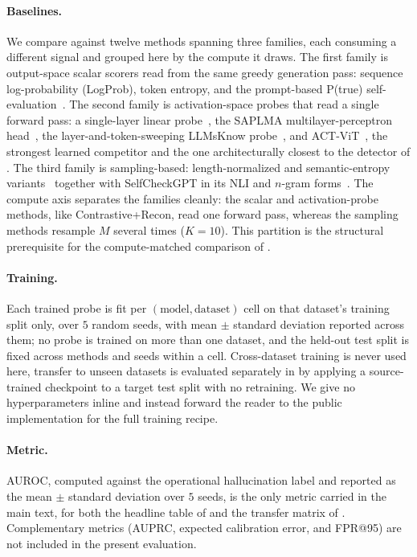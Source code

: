 \paragraph{Baselines.}
We compare against twelve methods spanning three families, each consuming a different signal and grouped here by the compute it draws. The first family is output-space scalar scorers read from the same greedy generation pass: sequence log-probability (LogProb), token entropy, and the prompt-based P(true) self-evaluation~\citep{kadavath2022language}. The second family is activation-space probes that read a single forward pass: a single-layer linear probe~\citep{alain2017understanding}, the SAPLMA multilayer-perceptron head~\citep{azaria2023internal}, the layer-and-token-sweeping LLMsKnow probe~\citep{orgad2024llmsknow}, and ACT-ViT~\citep{barshalom2025actvit}, the strongest learned competitor and the one architecturally closest to the detector of . The third family is sampling-based: length-normalized and semantic-entropy variants~\citep{farquhar2024detecting,kossen2024semantic} together with SelfCheckGPT in its NLI and $n$-gram forms~\citep{manakul2023selfcheckgpt}. The compute axis separates the families cleanly: the scalar and activation-probe methods, like Contrastive+Recon, read one forward pass, whereas the sampling methods resample $M$ several times ($K = 10$). This partition is the structural prerequisite for the compute-matched comparison of .

\paragraph{Training.}
Each trained probe is fit per $(\text{model}, \text{dataset})$ cell on that dataset's training split only, over $5$ random seeds, with mean $\pm$ standard deviation reported across them; no probe is trained on more than one dataset, and the held-out test split is fixed across methods and seeds within a cell. Cross-dataset training is never used here, transfer to unseen datasets is evaluated separately in  by applying a source-trained checkpoint to a target test split with no retraining. We give no hyperparameters inline and instead forward the reader to the public implementation for the full training recipe.

\paragraph{Metric.}
AUROC, computed against the operational hallucination label and reported as the mean $\pm$ standard deviation over $5$ seeds, is the only metric carried in the main text, for both the headline table of  and the transfer matrix of . Complementary metrics (AUPRC, expected calibration error, and FPR@95) are not included in the present evaluation.

